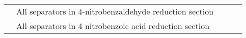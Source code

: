 {\begin{tabular}{@{}lp{5cm}p{2cm}p{2cm}p{12cm}@{}}
                                                      & All separators in 4-nitrobenzaldehyde reduction section &                                                                                        &                                                   &                                                                                                                                                                                                                                                                                                                                                                                                                                                                                                                                                                                                                                                                                                                                                                                                                                                                                                                    \\ \cmidrule(l){2-2}
                                                      & All separators in 4 nitrobenzoic acid reduction section &                                                                                        &                                                   &                                                                                                                                                                                                                                                                                                                                                                                                                                                                                                                                                                                                                                                                                                                                                                                                                                                                                                                    \\ \midrule

\end{tabular}}
